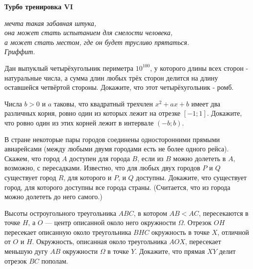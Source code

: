 \centerline{\bf \Huge Турбо тренировка VI}

\begin{flushright}
        \scriptsize{\it мечта такая забавная штука,
                    \\ она может стать испытанием для смелости человека,
                    \\ а может стать местом, где он будет трусливо прятаться.
                    \\ Гриффит.}
\end{flushright}

Дан выпуклый четырёхугольник периметра $10^{100}$, у которого длины всех сторон - натуральные числа, а сумма длин любых трёх сторон делится на длину оставшейся четвёртой стороны. Докажите, что этот четырёхугольник - ромб.

Числа $b>0$ и $a$ таковы, что квадратный трехчлен $x^2+a x+b$ имеет два различных корня, ровно один из которых лежит на отрезке $[-1 ; 1]$. Докажите, что ровно один из этих корней лежит в интервале $(-b ; b)$.


В стране некоторые пары городов соединены односторонними прямыми авиарейсами (между любыми двумя городами есть не более одного рейса). Скажем, что город $A$ доступен для города $B$, если из $B$ можно долететь в $A$, возможно, с пересадками. Известно, что для любых двух городов $P$ и $Q$ существует город $R$, для которого и $P$, и $Q$ доступны. Докажите, что существует город, для которого доступны все города страны. (Считается, что из города можно долететь до него самого.)

Высоты остроугольного треугольника $A B C$, в котором $A B <A C$, пересекаются в точке $H$, а $O$ --- центр описанной около него окружности $\Omega$. Отрезок $O H$ пересекает описанную около треугольника $B H C$ окружность в точке $X$, отличной от $O$ и $H$. Окружность, описанная около треугольника $A O X$, пересекает меньшую дугу $A B$ окружности $\Omega$ в точке $Y$. Докажите, что прямая $X Y$ делит отрезок $B C$ пополам.